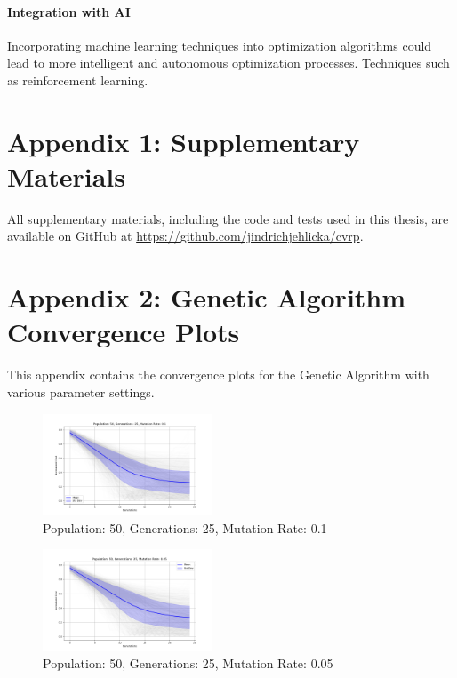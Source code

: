 \documentclass{article}
\begin{document}
    \paragraph{Integration with AI}
    Incorporating machine learning techniques into optimization algorithms could lead to more intelligent and autonomous optimization processes. Techniques such as reinforcement learning.


    \newpage



    
    \newpage

    \appendix


    \section{Appendix 1: Supplementary Materials}
    All supplementary materials, including the code and tests used in this thesis, are available on GitHub at \url{https://github.com/jindrichjehlicka/cvrp}.


    \section{Appendix 2: Genetic Algorithm Convergence Plots}

    This appendix contains the convergence plots for the Genetic Algorithm with various parameter settings.

    \begin{figure}[H]
        \centering
        \includegraphics[width=0.45\textwidth]{genetic_algorithm/appendix/Population_50_Generations_25_MutationRate_0.1}
        \caption{Population: 50, Generations: 25, Mutation Rate: 0.1}
        \label{fig:app_ga_50_25_1}
    \end{figure}

    \begin{figure}[H]
        \centering
        \includegraphics[width=0.45\textwidth]{genetic_algorithm/appendix/Population_50_Generations_25_MutationRate_0.05}
        \caption{Population: 50, Generations: 25, Mutation Rate: 0.05}
        \label{fig:app_ga_50_25_05}
    \end{figure}
\end{document}
